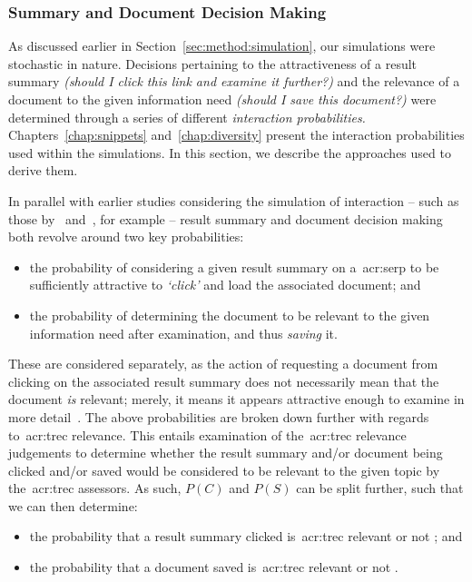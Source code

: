 \subsubsection{Summary and Document Decision Making}\label{sec:method:simulation:grounding:judgements}
As discussed earlier in Section~\ref{sec:method:simulation}, our simulations were stochastic in nature. Decisions pertaining to the attractiveness of a result summary \emph{(should I click this link and examine it further?)} and the relevance of a document to the given information need \emph{(should I save this document?)} were determined through a series of different \emph{interaction probabilities.} Chapters~\ref{chap:snippets} and~\ref{chap:diversity} present the interaction probabilities used within the simulations. In this section, we describe the approaches used to derive them.

In parallel with earlier studies considering the simulation of interaction -- such as those by~\cite{yilmaz2010browsing_utility} and~\cite{baskaya2013behavioural_factors}, for example -- result summary and document decision making both revolve around two key probabilities:

\begin{itemize}
    \item{the probability  of considering a given result summary on a~\gls{acr:serp} to be sufficiently attractive to \emph{`click'} and load the associated document; and}
    \item{the probability  of determining the document to be relevant to the given information need after examination, and thus \emph{saving} it.}
\end{itemize}

These are considered separately, as the action of requesting a document from clicking on the associated result summary does not necessarily mean that the document \emph{is} relevant; merely, it means it appears attractive enough to examine in more detail~\citep{turpin2009summaries}. The above probabilities are broken down further with regards to~\gls{acr:trec} relevance. This entails examination of the~\gls{acr:trec} relevance judgements to determine whether the result summary and/or document being clicked and/or saved would be considered to be relevant to the given topic by the~\gls{acr:trec} assessors. As such, $P(C)$ and $P(S)$ can be split further, such that we can then determine:

\begin{itemize}
    \item{the probability that a result summary clicked is~\gls{acr:trec} relevant  or not ; and}
    \item{the probability that a document saved is~\gls{acr:trec} relevant  or not .}
\end{itemize}

